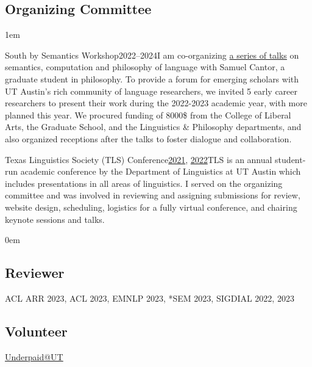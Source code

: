 \subsection{Organizing Committee}

\leftskip1em\relax

\smallentry
  {\large South by Semantics Workshop}{2022--2024}{I am co-organizing \href{https://sites.utexas.edu/sxsemantics/}{a series of talks} on semantics, computation and philosophy of language with Samuel Cantor, a graduate student in philosophy. To provide a forum for emerging scholars with UT Austin's rich community of language researchers, we invited 5 early career researchers to present their work during the 2022-2023 academic year, with more planned this year. We procured funding of 8000\$ from the College of Liberal Arts, the Graduate School, and the Linguistics \& Philosophy departments, and also  organized receptions after the talks to foster dialogue and collaboration.}
  
\smallentry
    {\large Texas Linguistics Society (TLS) Conference}{\href{http://tls.ling.utexas.edu/2021/}{2021}, \href{http://tls.ling.utexas.edu/2022/}{2022}}{TLS is an annual student-run academic conference by the Department of Linguistics at UT Austin which includes presentations in all areas of linguistics. I served on the organizing committee and was involved in reviewing and assigning submissions for review, website design, scheduling, logistics for a fully virtual conference, and chairing keynote sessions and talks.}

\leftskip0em\relax

\subsection{Reviewer}

\quad ACL ARR 2023, ACL 2023, EMNLP 2023, *SEM 2023, SIGDIAL 2022, 2023

\subsection{Volunteer}

\quad \href{http://underpaidatut.org}{Underpaid\makeatletter @\makeatother UT}
